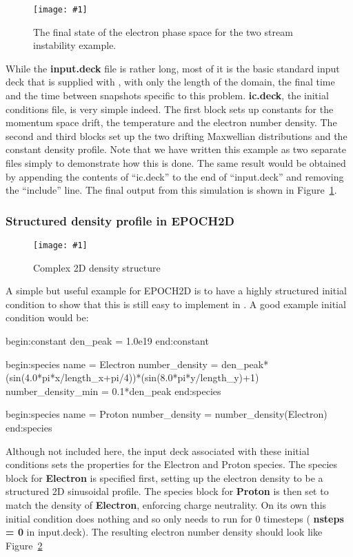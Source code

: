 \documentclass[12pt,a4paper]{article}
\newcommand{\inlineemph}[1]{{\color{warwicklight} \bf{#1}}}
\newcommand{\EPOCH}{{\color{warwickdark}\fontfamily{phv}\selectfont{EPOCH}}}
\newcommand{\scaledcapimage}[4]
  {{\begin{figure}[hbt!]\centering\texttt{[image: \#1]}\caption{#3}
    \label{#2} \end{figure}}}
\newenvironment{lboxverbatim}[1]{
\setlength{\FrameSep}{0pt}
\def\FrameCommand{\fboxsep=0pt \colorbox{shadecolor}}
\MakeFramed{\FrameRestore}
\vspace{-13.5pt}
\fvset{label=#1}
\boxverb
}{
\endboxverb
\vspace{-13.5pt}
\endMakeFramed
}
\begin{document}
\scaledcapimage{./images/late}{tsilate}{The final state of the electron
  phase space for the two stream instability example.}{0.4}

While the \inlineemph{input.deck} file is rather long, most of it is the basic
standard input deck that is supplied with {\EPOCH}, with only the length of the
domain, the final time and the time between snapshots specific to this
problem. \inlineemph{ic.deck}, the initial conditions file, is very simple
indeed. The first block sets up constants for the momentum space drift, the
temperature and the electron number density. The second and third blocks set up
the two drifting Maxwellian distributions and the constant density profile.
Note that we have written this example as two separate files simply
to demonstrate how this is done. The
same result would be obtained by appending the contents of ``ic.deck'' to
the end of ``input.deck'' and removing the ``include'' line.
The final output from this simulation is shown in Figure~\ref{tsilate}.

\subsubsection{Structured density profile in EPOCH2D}

\scaledcapimage{./images/shapetest}{densitycomplex}{Complex 2D density
  structure}{0.4}

A simple but useful example for EPOCH2D is to have a highly structured initial
condition to show that this is still easy to implement in {\EPOCH}. A good
example initial condition would be:
\begin{lboxverbatim}{ic.deck}
begin:constant
  den_peak = 1.0e19
end:constant

begin:species
  name = Electron
  number_density = den_peak*(sin(4.0*pi*x/length_x+pi/4))*(sin(8.0*pi*y/length_y)+1)
  number_density_min = 0.1*den_peak
end:species

begin:species
  name = Proton
  number_density = number_density(Electron)
end:species
\end{lboxverbatim}

Although not included here, the input deck associated with these initial
conditions sets the properties for the Electron and Proton species.
The species block for \inlineemph{Electron} is specified
first, setting up the electron density to be a structured 2D sinusoidal
profile. The species block for \inlineemph{Proton} is then set to
match the density of \inlineemph{Electron}, enforcing charge neutrality. On
its own this initial condition does nothing and so only needs to run for 0
timesteps (\inlineemph{nsteps = 0} in input.deck). The resulting electron number
density should look like Figure~\ref{densitycomplex}
\end{document}

